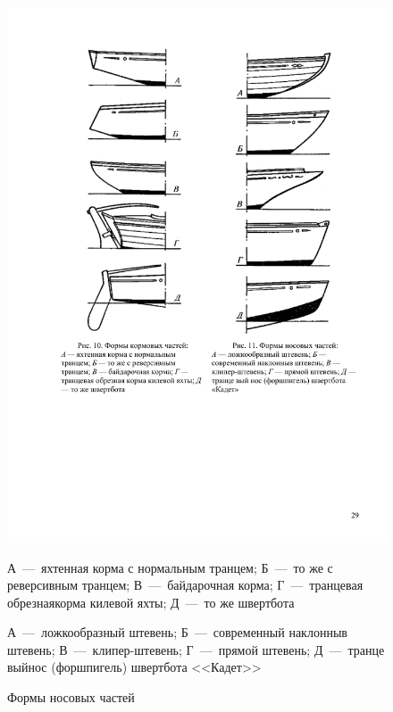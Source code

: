 \documentclass[a4paper, 12pt, twoside, final]{scrbook}
\begin{document}
\begin{figure}[htbp]
\begin{minipage}[b]{0.49\textwidth}
		\centering\includegraphics{pics/Formy_nos}
		\caption{Формы носовых частей}
		\label{fig:11}
	\end{minipage}
	\par
	\smallskip
	\begin{minipage}[b]{0.49\textwidth}
		\centering\small
		А~---~яхтенная корма с нормальным транцем;
		Б~---~то же с реверсивным транцем;
		В~---~байдарочная корма;
		Г~---~транцевая обрезнаякорма килевой яхты;
		Д~---~то же швертбота
	\end{minipage}
	\hfil\hfil%
	\begin{minipage}[b]{0.49\textwidth}
		\centering\small
		А~---~ложкообразный штевень;
		Б~---~современный наклонныв штевень;
		В~---~клипер-штевень;
		Г~---~прямой штевень;
		Д~---~транце выйнос (форшпигель) швертбота <<Кадет>>
	\end{minipage}
\end{figure}
\end{document}
